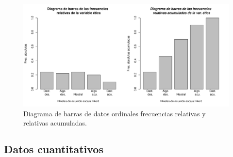 \begin{frame}
\begin{figure}
\begin{center} 
\includegraphics{./dibujos/01/-005}
\caption{Diagrama de barras de datos ordinales frecuencias relativas y relativas acumuladas.}
\end{center}
\end{figure} 
\end{frame}



\subsection{Datos cuantitativos}

